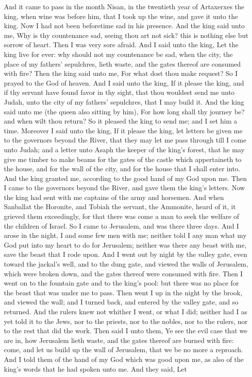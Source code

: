 And it came to pass in the month Nisan, in the twentieth year of Artaxerxes the king, when wine was before him, that I took up the wine, and gave it unto the king. Now I had not been beforetime sad in his presence. And the king said unto me, Why is thy countenance sad, seeing thou art not sick? this is nothing else but sorrow of heart. Then I was very sore afraid. And I said unto the king, Let the king live for ever: why should not my countenance be sad, when the city, the place of my fathers’ sepulchres, lieth waste, and the gates thereof are consumed with fire? Then the king said unto me, For what dost thou make request? So I prayed to the God of heaven. And I said unto the king, If it please the king, and if thy servant have found favor in thy sight, that thou wouldest send me unto Judah, unto the city of my fathers’ sepulchres, that I may build it. And the king said unto me (the queen also sitting by him), For how long shall thy journey be? and when wilt thou return? So it pleased the king to send me; and I set him a time. Moreover I said unto the king, If it please the king, let letters be given me to the governors beyond the River, that they may let me pass through till I come unto Judah; and a letter unto Asaph the keeper of the king’s forest, that he may give me timber to make beams for the gates of the castle which appertaineth to the house, and for the wall of the city, and for the house that I shall enter into. And the king granted me, according to the good hand of my God upon me.  Then I came to the governors beyond the River, and gave them the king’s letters. Now the king had sent with me captains of the army and horsemen. And when Sanballat the Horonite, and Tobiah the servant, the Ammonite, heard of it, it grieved them exceedingly, for that there was come a man to seek the welfare of the children of Israel. So I came to Jerusalem, and was there three days. And I arose in the night, I and some few men with me; neither told I any man what my God put into my heart to do for Jerusalem; neither was there any beast with me, save the beast that I rode upon. And I went out by night by the valley gate, even toward the jackal’s well, and to the dung gate, and viewed the walls of Jerusalem, which were broken down, and the gates thereof were consumed with fire. Then I went on to the fountain gate and to the king’s pool: but there was no place for the beast that was under me to pass. Then went I up in the night by the brook, and viewed the wall; and I turned back, and entered by the valley gate, and so returned. And the rulers knew not whither I went, or what I did; neither had I as yet told it to the Jews, nor to the priests, nor to the nobles, nor to the rulers, nor to the rest that did the work.  Then said I unto them, Ye see the evil case that we are in, how Jerusalem lieth waste, and the gates thereof are burned with fire: come, and let us build up the wall of Jerusalem, that we be no more a reproach. And I told them of the hand of my God which was good upon me, as also of the king’s words that he had spoken unto me. And they said, Let 